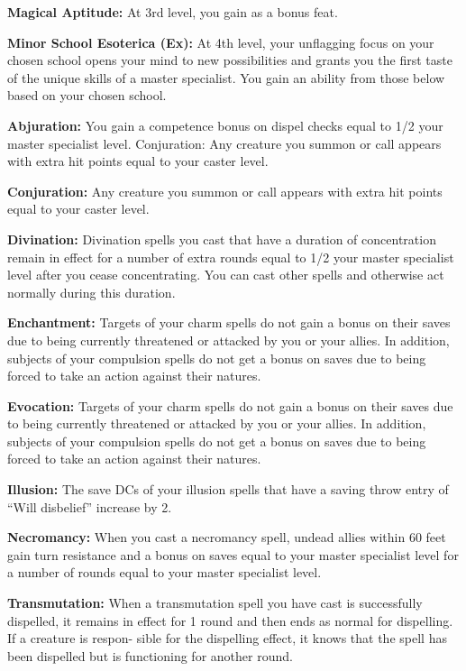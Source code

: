 \textbf{Magical Aptitude:} At 3rd level, you gain  as a bonus feat.

\textbf{Minor School Esoterica (Ex):} At 4th level, your unflagging focus on your chosen school opens your mind to new possibilities and grants you the first taste of the unique skills of a master specialist. You gain an ability from those below based on your chosen school.

\begin{itemize*}
\item \textbf{Abjuration:} You gain a competence bonus on dispel checks equal to 1/2 your master specialist level. Conjuration: Any creature you summon or call appears with extra hit points equal to your caster level.
\item \textbf{Conjuration:} Any creature you summon or call appears with extra hit points equal to your caster level.
\item \textbf{Divination:} Divination spells you cast that have a duration of concentration remain in effect for a number of extra rounds equal to 1/2 your master specialist level after you cease
concentrating. You can cast other spells and otherwise act normally during this duration.
\item \textbf{Enchantment:} Targets of your charm spells do not gain a bonus on their saves due to being currently threatened or attacked by you or your allies. In addition, subjects of your compulsion spells do not get a bonus on saves due to being forced to take an action against their natures.
\item \textbf{Evocation:} Targets of your charm spells do not gain a bonus on their saves due to being currently threatened or attacked by you or your allies. In addition, subjects of your compulsion spells do not get a bonus on saves due to being forced to take an action against their natures.
\item \textbf{Illusion:} The save DCs of your illusion spells that have a saving throw entry of “Will disbelief” increase by 2.
\item \textbf{Necromancy:} When you cast a necromancy spell, undead allies within 60 feet gain turn resistance and a bonus on saves equal to your master specialist level for a number of rounds equal to your master specialist level.
\item \textbf{Transmutation:} When a transmutation spell you have cast is successfully dispelled, it remains in effect for 1 round and then ends as normal for dispelling. If a creature is respon- sible for the dispelling effect, it knows that the spell has been dispelled but is functioning for another round.
\end{itemize*}


